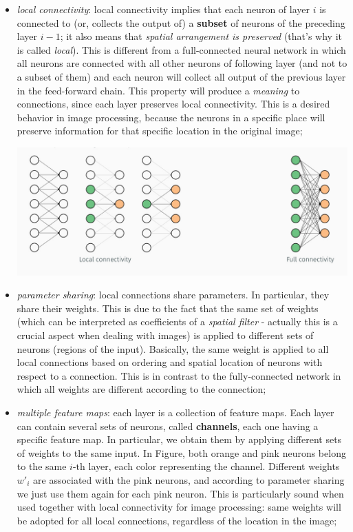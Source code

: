 \documentclass[10pt]{report}
\begin{document}
\begin{itemize}
\item \emph{local connectivity}: local connectivity implies that each neuron of
layer \(i\) is connected to (or, collects the output of) a \textbf{subset} of
neurons of the preceding layer \(i - 1\); it also means that \emph{spatial
arrangement is preserved} (that's why it is called \emph{local}). This is
different from a full-connected neural network in which all neurons
are connected with all other neurons of following layer (and not to a
subset of them) and each neuron will collect all output of the
previous layer in the feed-forward chain. This property will produce a
\emph{meaning} to connections, since each layer preserves local
connectivity. This is a desired behavior in image processing, because
the neurons in a specific place will preserve information for that
specific location in the original image;

\begin{center}
\includegraphics[width=.9\linewidth]{./pics/cnn/local-connectivity.jpg}
\end{center}

\item \emph{parameter sharing}: local connections share parameters. In
particular, they share their weights. This is due to the fact that the
same set of weights (which can be interpreted as coefficients of a
\emph{spatial filter} - actually this is a crucial aspect when dealing with
images) is applied to different sets of neurons (regions of the
input). Basically, the same weight is applied to all local connections
based on ordering and spatial location of neurons with respect to a
connection. This is in contrast to the fully-connected network in
which all weights are different according to the connection;

\item \emph{multiple feature maps}: each layer is a collection of feature maps.
Each layer can contain several sets of neurons, called \textbf{channels},
each one having a specific feature map. In particular, we obtain them
by applying different sets of weights to the same input. In Figure,
both orange and pink neurons belong to the same \(i\mbox{-th}\) layer,
each color representing the channel. Different weights \(w'_ i\) are
associated with the pink neurons, and according to parameter sharing
we just use them again for each pink neuron. This is particularly
sound when used together with local connectivity for image processing:
same weights will be adopted for all local connections, regardless of
the location in the image;


\end{itemize}
\end{document}
